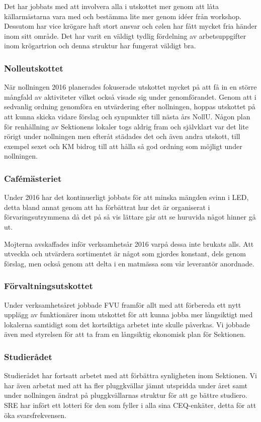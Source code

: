 \documentclass[../_main/handlingar.tex]{subfiles}
\begin{document}
Det har jobbats med att involvera alla i utskottet mer genom att låta källarmästarna vara med och bestämma lite mer genom idéer från workshop. Dessutom har vice krögare haft stort ansvar och cølen har fått mycket fria händer inom sitt område. Det har varit en väldigt tydlig fördelning av arbetsuppgifter inom krögartrion och denna struktur har fungerat väldigt bra.

\subsubsection*{Nolleutskottet}
När nollningen 2016 planerades fokuserade utskottet mycket på att få in en större mångfald av aktiviteter vilket också visade sig under genomförandet. Genom att i sedvanlig ordning genomföra en utvärdering efter nollningen, hoppas utskottet på att kunna skicka vidare förslag och synpunkter till nästa års NollU. Någon plan för renhållning av Sektionens lokaler togs aldrig fram och självklart var det lite rörigt under nollningen men efteråt städades det och även andra utskott, till exempel sexet och KM bidrog till att hålla så god ordning som möjligt under nollningen.
\newpage
\subsubsection*{Cafémästeriet}
Under 2016 har det kontinuerligt jobbats för att minska mängden svinn i LED, detta bland annat genom att ha förbättrat hur det är organiserat i förvaringsutrymmena då det på så vis lättare går att se huruvida något hinner gå ut.

Mojterna avskaffades inför verksamhetsår 2016 varpå dessa inte brukats alls.
Att utveckla och utvärdera sortimentet är något som gjordes konstant, dels genom förslag, men också genom att delta i en matmässa som vår leverantör anordnade.

\subsubsection*{Förvaltningsutskottet}
Under verksamhetsåret jobbade FVU framför allt med att förbereda ett nytt upplägg av funktionärer inom utskottet för att kunna jobba mer långsiktigt med lokalerna samtidigt som det kortsiktiga arbetet inte skulle påverkas. Vi jobbade även med styrelsen för att ta fram en långsiktig ekonomisk plan för Sektionen.

\subsubsection*{Studierådet}
Studierådet har fortsatt arbetet med att förbättra synligheten inom Sektionen. Vi har även arbetat med att ha fler pluggkvällar jämnt utspridda under året samt under nollningen ändrat på pluggkvällarnas struktur för att ge bättre studiero. SRE har infört ett lotteri för den som fyller i alla sina CEQ-enkäter, detta för att öka svarsfrekvensen.
\end{document}
